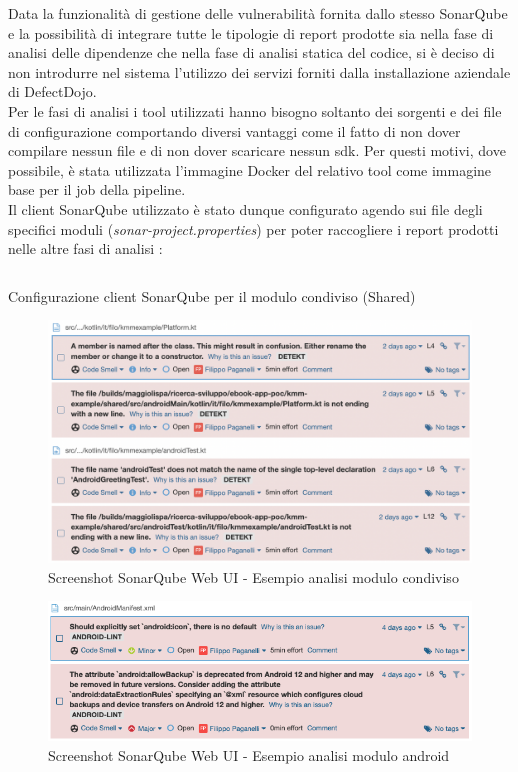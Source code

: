 Data la funzionalità di gestione delle vulnerabilità fornita dallo stesso SonarQube e la possibilità di integrare tutte le tipologie di report prodotte sia nella fase di analisi delle dipendenze che nella fase di analisi statica del codice, si è deciso di non introdurre nel sistema l'utilizzo dei servizi forniti dalla installazione aziendale di DefectDojo.\\
Per le fasi di analisi i tool utilizzati hanno bisogno soltanto dei sorgenti e dei file di configurazione comportando diversi vantaggi come il fatto di non dover compilare nessun file e di non dover scaricare nessun sdk. Per questi motivi, dove possibile, è stata utilizzata l'immagine Docker del relativo tool come immagine base per il job della pipeline.\\
Il client SonarQube utilizzato è stato dunque configurato agendo sui file degli specifici moduli (\textit{sonar-project.properties}) per poter raccogliere i report prodotti nelle altre fasi di analisi :
\begin{listing}[H]
\inputminted{kotlin}{code/4-sonarplugin}
\caption{Configurazione client SonarQube per il modulo condiviso (Shared)}
\end{listing}
\begin{figure}[H]
\centering
\includegraphics[width=1\textwidth]{img/Screenshot 2022-06-19 at 15.33.37.png}
\caption{Screenshot SonarQube Web UI - Esempio analisi modulo condiviso}
\end{figure}
\begin{figure}[H]
\centering
\includegraphics[width=1\textwidth]{img/Screenshot 2022-06-21 at 09.58.58.png}
\caption{Screenshot SonarQube Web UI - Esempio analisi modulo android}
\end{figure}

